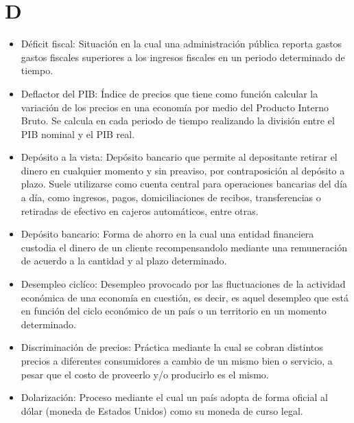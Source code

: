 \documentclass{article}
\begin{document}
\section{D}
\begin{itemize}

\item Déficit fiscal: Situación en la cual una administración pública reporta gastos gastos fiscales superiores a los ingresos fiscales en un periodo determinado de tiempo. 

\item Deflactor del PIB: Índice de precios que tiene como función calcular la variación de los precios en una economía por medio del Producto Interno Bruto. Se calcula en cada periodo de tiempo realizando la división entre el PIB nominal y el PIB real. 

\item Depósito a la vista: Depósito bancario que permite al depositante retirar el dinero en cualquier momento y sin preaviso, por contraposición al depósito a plazo. Suele utilizarse como cuenta central para operaciones bancarias del día a día, como ingresos, pagos, domiciliaciones de recibos, transferencias o retiradas de efectivo en cajeros automáticos, entre otras.

\item Depósito bancario: Forma de ahorro en la cual una entidad financiera custodia el dinero de un cliente recompensandolo mediante una remuneración de acuerdo a la cantidad y al plazo determinado. 

\item Desempleo ciclíco: Desempleo provocado por las fluctuaciones de la actividad económica de una economía en cuestión, es decir, es aquel desempleo que está en función del ciclo económico de un país o un territorio en un momento determinado. 

\item Discriminación de precios: Práctica mediante la cual se cobran distintos precios a diferentes consumidores a cambio de un mismo bien o servicio, a pesar que el costo de proveerlo y/o producirlo es el mismo. 

\item Dolarización: Proceso mediante el cual un país adopta de forma oficial al dólar (moneda de Estados Unidos) como su moneda de curso legal. 


\end{itemize}
\end{document}
